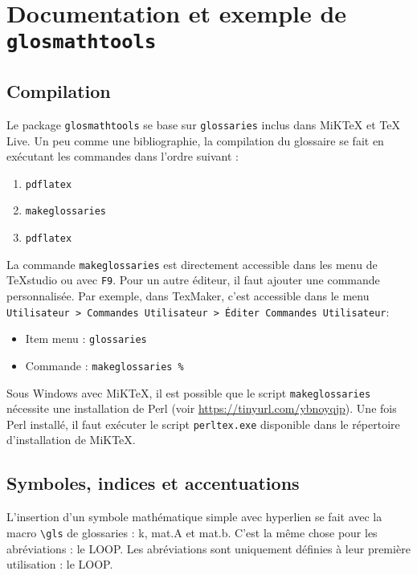 \documentclass[projet,nohyperref,english,french]{ulthese}
\begin{document}
\frontmatter  
           
\frontispice
\printglossary[title=Nomenclature]

\mainmatter                     

\chapter{Documentation et exemple de \texttt{glosmathtools}}

\section{Compilation}
Le package \texttt{glosmathtools} se base sur \texttt{glossaries} inclus dans MiKTeX et TeX Live. Un peu comme une bibliographie, la compilation du glossaire se fait en exécutant les commandes dans l'ordre suivant :
\begin{enumerate}
	\item \texttt{pdflatex}
	\item \texttt{makeglossaries}
	\item \texttt{pdflatex}
\end{enumerate}
La commande \texttt{makeglossaries} est directement accessible dans les menu de TeXstudio ou avec \texttt{F9}. Pour un autre éditeur, il faut ajouter une commande personnalisée. Par exemple, dans TexMaker, c’est accessible dans le menu \texttt{Utilisateur > Commandes Utilisateur > Éditer Commandes Utilisateur}:
\begin{itemize}
	\item Item menu : \texttt{glossaries} 
	\item Commande : \texttt{makeglossaries \%}
\end{itemize}
Sous Windows avec MiKTeX, il est possible que le script \texttt{makeglossaries} nécessite une installation de Perl (voir \url{https://tinyurl.com/ybnoyqjp}). Une fois Perl installé, il faut exécuter le script \texttt{perltex.exe} disponible dans le répertoire d'installation de MiKTeX.

\section{Symboles, indices et accentuations}

L'insertion d'un symbole mathématique simple avec hyperlien se fait avec la macro \texttt{\textbackslash gls} de glossaries : \gls{k}, \gls{mat.A} et \gls{mat.b}. C'est la même chose pour les abréviations : le \gls{LOOP}. Les abréviations sont uniquement définies à leur première utilisation : le \gls{LOOP}.
\end{document}
